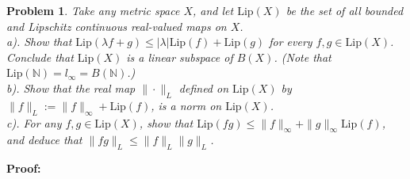\documentclass[12pt]{article}
\newtheorem{problem}{Problem}
\begin{document}
\begin{problem}
Take any metric space $X$, and let $\text{Lip}(X)$ be the set of all bounded and Lipschitz continuous real-valued maps on $X$. \\
\indent a). Show that $\text{Lip}(\lambda f+g)\leq|\lambda|\text{Lip}(f)+\text{Lip}(g)$ for every $f,g\in \text{Lip}(X)$. Conclude that $\text{Lip}(X)$ is a linear subspace of $B(X)$. (Note that $\text{Lip}(\mathbb{N})=l_{\infty}=B(\mathbb{N})$.) \\
\indent b). Show that the real map $\|\cdot\|_{L}$ defined on $\text{Lip}(X)$ by $\|f\|_{L}:=\|f\|_{\infty}+\text{Lip}(f)$, is a norm on $\text{Lip}(X)$. \\
\indent c). For any $f,g\in\text{Lip}(X)$, show that $\text{Lip}(fg)\leq\|f\|_{\infty}+\|g\|_{\infty}\text{Lip}(f)$, and deduce that $\|fg\|_{L}\leq\|f\|_{L}\|g\|_{L}$.
\end{problem}

\textbf{Proof:} 
\end{document}
